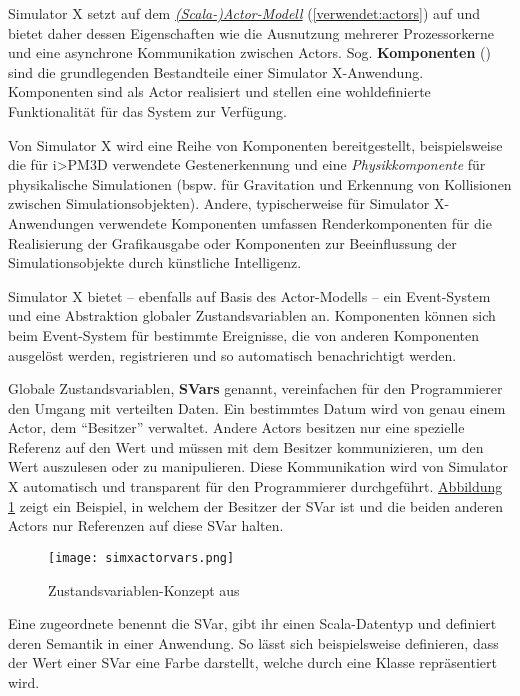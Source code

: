 \documentclass[a4paper,10pt]{sphinxmanual}
\begin{document}
Simulator X setzt auf dem {\hyperref[verwendet:actors]{\emph{(Scala-)Actor-Modell}}} (\autoref*{verwendet:actors}) auf und bietet daher dessen Eigenschaften wie die Ausnutzung mehrerer Prozessorkerne und eine asynchrone Kommunikation zwischen Actors.
Sog. \textbf{Komponenten} () sind die grundlegenden Bestandteile einer Simulator X-Anwendung. Komponenten sind als Actor realisiert und stellen eine wohldefinierte Funktionalität für das System zur Verfügung.

Von Simulator X wird eine Reihe von Komponenten bereitgestellt, beispielsweise die für i\textgreater{}PM3D verwendete Gestenerkennung und eine \emph{Physikkomponente} für physikalische Simulationen (bspw. für Gravitation und Erkennung von Kollisionen zwischen Simulationsobjekten).
Andere, typischerweise für Simulator X-Anwendungen verwendete Komponenten umfassen Renderkomponenten für die Realisierung der Grafikausgabe oder Komponenten zur Beeinflussung der Simulationsobjekte durch künstliche Intelligenz.

Simulator X bietet – ebenfalls auf Basis des Actor-Modells – ein Event-System und eine Abstraktion globaler Zustandsvariablen an.
Komponenten können sich beim Event-System für bestimmte Ereignisse, die von anderen Komponenten ausgelöst werden, registrieren und so automatisch benachrichtigt werden.

Globale Zustandsvariablen, \textbf{SVars} genannt, vereinfachen für den Programmierer den Umgang mit verteilten Daten.
Ein bestimmtes Datum wird von genau einem Actor, dem "`Besitzer"' verwaltet.
Andere Actors besitzen nur eine spezielle Referenz auf den Wert und müssen mit dem Besitzer kommunizieren, um den Wert auszulesen oder zu manipulieren.
Diese Kommunikation wird von Simulator X automatisch und transparent für den Programmierer durchgeführt.
\hyperref[verwendet:svars]{Abbildung  \ref*{verwendet:svars}} zeigt ein Beispiel, in welchem  der Besitzer der SVar ist und die beiden anderen Actors nur Referenzen auf diese SVar halten.
\begin{figure}[htbp]
\centering
\capstart

\texttt{[image: simxactorvars.png]}
\caption{Zustandsvariablen-Konzept aus \cite{latoschik_simulator_2011}}\label{verwendet:svars}\end{figure}

Eine zugeordnete benennt die SVar, gibt ihr einen Scala-Datentyp und definiert deren Semantik in einer Anwendung.
So lässt sich beispielsweise definieren, dass der Wert einer SVar eine Farbe darstellt, welche durch eine Klasse  repräsentiert wird.
\end{document}
